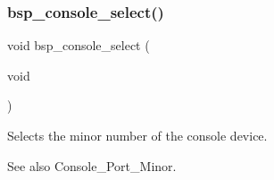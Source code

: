 \subsubsection{\texorpdfstring{bsp\_console\_select()}{bsp\_console\_select()}}
{\footnotesize\ttfamily void bsp\+\_\+console\+\_\+select (\begin{DoxyParamCaption}\item[{void}]{ }\end{DoxyParamCaption})}



Selects the minor number of the console device. 

\begin{DoxySeeAlso}{See also}
Console\+\_\+\+Port\+\_\+\+Minor. 
\end{DoxySeeAlso}
